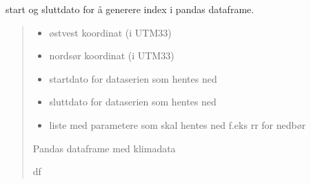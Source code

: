 \documentclass[letterpaper,10pt,norsk]{sphinxmanual}
\begin{document}
\begin{fulllineitems}
\label{\detokenize{index:klimadata.klimadata.klima_dataframe}}
\pysigstartsignatures
{}
\pysigstopsignatures\begin{description}
\sphinxAtStartPar
start og sluttdato for å generere index i pandas dataframe.

\end{description}
\begin{quote}\begin{description}
\begin{itemize}
\item {} 
\sphinxAtStartPar
{} \textendash{} øst\sphinxhyphen{}vest koordinat (i UTM33)

\item {} 
\sphinxAtStartPar
{} \textendash{} nord\sphinxhyphen{}sør koordinat (i UTM33)

\item {} 
\sphinxAtStartPar
{} \textendash{} startdato for dataserien som hentes ned

\item {} 
\sphinxAtStartPar
{} \textendash{} sluttdato for dataserien som hentes ned

\item {} 
\sphinxAtStartPar
{} \textendash{} liste med parametere som skal hentes ned f.eks rr for nedbør

\end{itemize}

\sphinxAtStartPar
Pandas dataframe med klimadata

\sphinxAtStartPar
df

\end{description}\end{quote}

\end{fulllineitems}
\end{document}
